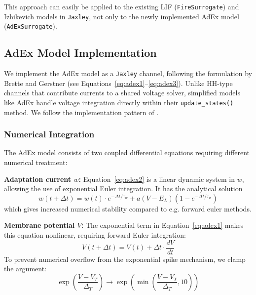 \documentclass[conference]{IEEEtran}
\begin{document}
This approach can easily be applied to the existing \ac{LIF} (\texttt{Fire\-Surrogate}) and Izhikevich models in \texttt{Jax\-ley},
not only to the newly implemented \ac{AdEx} model (\texttt{AdEx\-Surro\-gate}).

\subsection{AdEx Model Implementation}\label{sec:adex_impl}
We implement the \ac{AdEx} model as a \texttt{Jaxley} channel, following the formulation by Brette and Gerstner \cite{Brette2005} (see Equations~\ref{eq:adex1}--\ref{eq:adex3}).
Unlike \ac{HH}-type channels that contribute currents to a shared voltage solver, simplified models like \ac{AdEx} handle voltage integration directly within their \texttt{update\_states()} method.
We follow the implementation pattern of \cite{Deistler2025}.

\subsubsection{Numerical Integration}
The \ac{AdEx} model consists of two coupled differential equations requiring different numerical treatment:

\textbf{Adaptation current $w$:}
Equation~\ref{eq:adex2} is a linear dynamic system in $w$, allowing the use of exponential Euler integration.
It has the analytical solution
\begin{equation}
  w(t+\Delta t) = w(t) \cdot e^{-\Delta t / \tau_w} + a(V - E_L)(1 - e^{-\Delta t / \tau_w})
\end{equation}\label{eq:adaption-current-integration}
which gives increased numerical stability compared to e.g. forward euler methods.

\textbf{Membrane potential $V$:}
The exponential term in Equation~\ref{eq:adex1} makes this equation nonlinear, requiring forward Euler integration:
\begin{equation}
    V(t + \Delta t) = V(t) + \Delta t \cdot \frac{dV}{dt}
\end{equation}
To prevent numerical overflow from the exponential spike mechanism, we clamp the argument:
\begin{equation}
    \exp\left(\frac{V - V_T}{\Delta_T}\right) \rightarrow \exp\left(\min\left(\frac{V - V_T}{\Delta_T}, 10\right)\right)
\end{equation}
\end{document}
